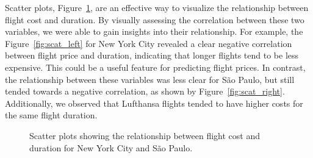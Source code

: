 Scatter plots, Figure~\ref{fig:scatter}, are an effective way to visualize the relationship between flight cost and duration.
By visually assessing the correlation between these two variables, we were able to gain insights into their relationship.
For example, the Figure~\ref{fig:scat_left} for New York City revealed a clear negative correlation between flight price and duration, indicating that longer flights tend to be less expensive.
This could be a useful feature for predicting flight prices. In contrast, the relationship between these variables was less clear for São Paulo, but still tended towards a negative correlation, as shown by Figure~\ref{fig:scat_right}.
Additionally, we observed that Lufthansa flights tended to have higher costs for the same flight duration.
\begin{figure}
    \centering
    \caption{Scatter plots showing the relationship between flight cost and duration for New York City and São Paulo.}
    \label{fig:scatter}
\end{figure}

